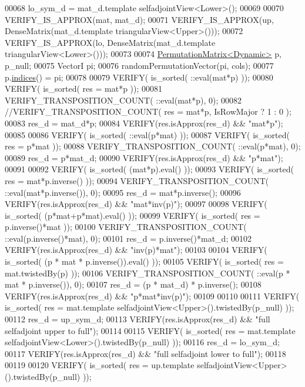 \begin{DoxyCode}
00068   lo\_sym\_d = mat\_d.template selfadjointView<Lower>();
00069   
00070   VERIFY\_IS\_APPROX(mat, mat\_d);
00071   VERIFY\_IS\_APPROX(up, DenseMatrix(mat\_d.template triangularView<Upper>()));
00072   VERIFY\_IS\_APPROX(lo, DenseMatrix(mat\_d.template triangularView<Lower>()));
00073   
00074   \hyperlink{group___core___module_class_eigen_1_1_permutation_matrix}{PermutationMatrix<Dynamic>} p, p\_null;
00075   VectorI pi;
00076   randomPermutationVector(pi, cols);
00077   p.\hyperlink{group___core___module_a2f1ab379207fcd1ceb33941e25cf50c2}{indices}() = pi;
00078 
00079   VERIFY( is\_sorted( ::eval(mat*p) ));
00080   VERIFY( is\_sorted( res = mat*p ));
00081   VERIFY\_TRANSPOSITION\_COUNT( ::eval(mat*p), 0);
00082   \textcolor{comment}{//VERIFY\_TRANSPOSITION\_COUNT( res = mat*p, IsRowMajor ? 1 : 0 );}
00083   res\_d = mat\_d*p;
00084   VERIFY(res.isApprox(res\_d) && \textcolor{stringliteral}{"mat*p"});
00085 
00086   VERIFY( is\_sorted( ::eval(p*mat) ));
00087   VERIFY( is\_sorted( res = p*mat ));
00088   VERIFY\_TRANSPOSITION\_COUNT( ::eval(p*mat), 0);
00089   res\_d = p*mat\_d;
00090   VERIFY(res.isApprox(res\_d) && \textcolor{stringliteral}{"p*mat"});
00091 
00092   VERIFY( is\_sorted( (mat*p).eval() ));
00093   VERIFY( is\_sorted( res = mat*p.inverse() ));
00094   VERIFY\_TRANSPOSITION\_COUNT( ::eval(mat*p.inverse()), 0);
00095   res\_d = mat*p.inverse();
00096   VERIFY(res.isApprox(res\_d) && \textcolor{stringliteral}{"mat*inv(p)"});
00097 
00098   VERIFY( is\_sorted( (p*mat+p*mat).eval() ));
00099   VERIFY( is\_sorted( res = p.inverse()*mat ));
00100   VERIFY\_TRANSPOSITION\_COUNT( ::eval(p.inverse()*mat), 0);
00101   res\_d = p.inverse()*mat\_d;
00102   VERIFY(res.isApprox(res\_d) && \textcolor{stringliteral}{"inv(p)*mat"});
00103 
00104   VERIFY( is\_sorted( (p * mat * p.inverse()).eval() ));
00105   VERIFY( is\_sorted( res = mat.twistedBy(p) ));
00106   VERIFY\_TRANSPOSITION\_COUNT( ::eval(p * mat * p.inverse()), 0);
00107   res\_d = (p * mat\_d) * p.inverse();
00108   VERIFY(res.isApprox(res\_d) && \textcolor{stringliteral}{"p*mat*inv(p)"});
00109 
00110   
00111   VERIFY( is\_sorted( res = mat.template selfadjointView<Upper>().twistedBy(p\_null) ));
00112   res\_d = up\_sym\_d;
00113   VERIFY(res.isApprox(res\_d) && \textcolor{stringliteral}{"full selfadjoint upper to full"});
00114   
00115   VERIFY( is\_sorted( res = mat.template selfadjointView<Lower>().twistedBy(p\_null) ));
00116   res\_d = lo\_sym\_d;
00117   VERIFY(res.isApprox(res\_d) && \textcolor{stringliteral}{"full selfadjoint lower to full"});
00118   
00119   
00120   VERIFY( is\_sorted( res = up.template selfadjointView<Upper>().twistedBy(p\_null) ));

\end{DoxyCode}
